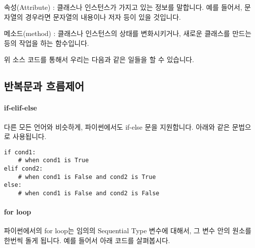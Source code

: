 \documentclass[twoside]{article}
\begin{document}
\begin{compactitem}
\item 속성(Attribute) : 클래스나 인스턴스가 가지고 있는 정보를 말합니다. 예를 들어서, 문자열의 경우라면 문자열의 내용이나 저자 등이 있을 것입니다. 
\item 메소드(method) : 클래스나 인스턴스의 상태를 변화시키거나, 새로운 클래스를 만드는 등의 작업을 하는 함수입니다. 
\end{compactitem}



위 소스 코드를 통해서 우리는 다음과 같은 일들을 할 수 있습니다. 




                
\subsection{반복문과 흐름제어} 

\paragraph{if-elif-else} 다른 모든 언어와 비슷하게, 파이썬에서도 if-else 문을 지원합니다. 아래와 같은 문법으로 사용됩니다. 

\begin{lstlisting}[style=python] 
if cond1:
    # when cond1 is True 
elif cond2:
    # when cond1 is False and cond2 is True
else:
    # when cond1 is False and cond2 is False
\end{lstlisting}


% 



\paragraph{for loop} 파이썬에서의 for loop는 임의의 Sequential Type 변수에 대해서, 그 변수 안의 원소를 한번씩 돌게 됩니다. 예를 들어서 아래 코드를 살펴봅시다. 
\end{document}

